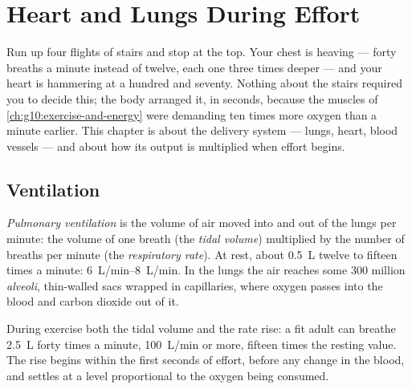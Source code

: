 \chapter{Heart and Lungs During Effort}\label{ch:g10:heart-lungs-effort}

Run up four flights of stairs and stop at the top. Your chest is heaving
--- forty breaths a minute instead of twelve, each one three times
deeper --- and your heart is hammering at a hundred and seventy. Nothing
about the stairs required you to decide this; the body arranged it, in
seconds, because the muscles of \cref{ch:g10:exercise-and-energy} were
demanding ten times more oxygen than a minute earlier. This chapter is
about the delivery system --- lungs, heart, blood vessels --- and about
how its output is multiplied when effort begins.

\section{Ventilation}

\begin{definition}[Ventilation]\label{def:g10:heart-lungs-effort:ventilation}
\emph{Pulmonary ventilation} is the volume of air
moved into and out of the lungs per minute: the volume of one breath
(the \emph{tidal volume}) multiplied by the number of breaths per
minute (the \emph{respiratory rate}). At rest, about \qty{0.5}{L}
twelve to fifteen times a minute: \qtyrange{6}{8}{L/min}. In the
lungs the air reaches some 300 million \emph{alveoli},
thin-walled sacs wrapped in capillaries, where oxygen passes into the
blood and carbon dioxide out of it.
\end{definition}

\begin{proposition}\label{prop:g10:heart-lungs-effort:vent-exercise}
During exercise both the tidal volume and the rate rise: a fit adult
can breathe \qty{2.5}{L} forty times a minute, \qty{100}{L/min} or
more, fifteen times the resting value. The rise begins within the
first seconds of effort, before any change in the blood, and settles
at a level proportional to the oxygen being consumed.
\end{proposition}
\admitted

